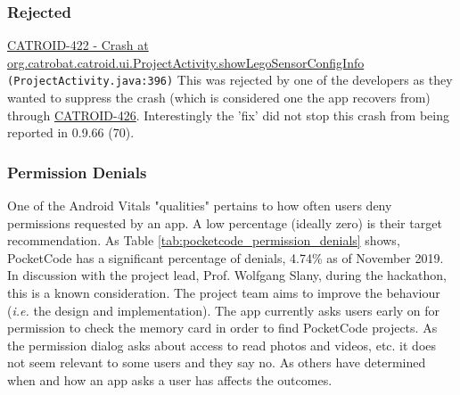 \subsubsection{Rejected}
\href{https://jira.catrob.at/browse/CATROID-422}{CATROID-422 - Crash at org.catrobat.catroid.ui.ProjectActivity.showLegoSensorConfigInfo } \texttt{(ProjectActivity.java:396)} %
This was rejected by one of the developers as they wanted to suppress the crash (which is considered one the app recovers from) through \href{https://jira.catrob.at/browse/CATROID-426}{CATROID-426}. Interestingly the 'fix' did not stop this crash from being reported in 0.9.66 (70).

\subsubsection{Permission Denials}
One of the Android Vitals "qualities" pertains to how often users deny permissions requested by an app. A low percentage (ideally zero) is their target recommendation. As Table \ref{tab:pocketcode_permission_denials} shows, PocketCode has a significant percentage of denials, 4.74\% as of  November 2019. In discussion with the project lead, Prof. Wolfgang Slany, during the hackathon, this is a known consideration. The project team aims to improve the behaviour (\emph{i.e.} the design and implementation). The app currently asks users early on for permission to check the memory card in order to find PocketCode projects. As the permission dialog asks about access to read photos and videos, etc. it does not seem relevant to some users and they say no. As others have determined  when and how an app asks a user has affects the outcomes.


